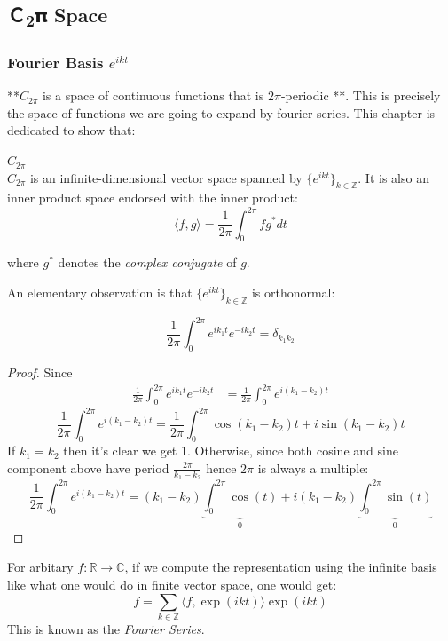 \subsection{Ｃ\textsubscript{2}𝛑 Space}

\subsubsection{Fourier Basis $e^{ikt}$}

**$C_{2\pi}$  is a space of  continuous functions that is $2\pi$-periodic **. This is precisely the space of functions we are going to expand by fourier series. This chapter is dedicated to show that:

\begin{theorem}\textbf{$C_{2\pi}$}\\
$C_{2\pi}$ is an infinite-dimensional vector space spanned by $\{e^{ikt}\}_{k\in\mathbb{Z}}$. It is also an inner product space endorsed with the inner product:
\begin{equation}
\langle f,g \rangle = \frac{1}{2\pi}\int_{0}^{2\pi} fg^*dt
\end{equation}

\end{theorem}where $g^*$ denotes the \textit{complex conjugate} of $g$.

An elementary observation is that  $\{e^{ikt}\}_{k\in\mathbb{Z}}$ is orthonormal:

\begin{equation}
\frac{1}{2\pi}\int_0^{2\pi}e^{ik_1t}e^{-ik_2t}=\delta_{k_1k_2}
\end{equation}

\begin{proof}Since
\begin{equation}
\begin{aligned}
\frac{1}{2\pi}\int_0^{2\pi}e^{ik_1t}e^{-ik_2t} &= \frac{1}{2\pi}\int_0^{2\pi}e^{i(k_1-k_2)t}
\end{aligned}
\end{equation}
\begin{equation}
\frac{1}{2\pi}\int_0^{2\pi}e^{i(k_1-k_2)t} = \frac{1}{2\pi}\int_0^{2\pi}\cos(k_1-k_2)t + i\sin(k_1-k_2)t
\end{equation}
If $k_1=k_2$ then it's clear we get 1. Otherwise, since both cosine and sine component above have period $\frac{2\pi}{k_1 -k_2}$ hence $2\pi$ is always a multiple:
\begin{equation}
\frac{1}{2\pi}\int_0^{2\pi}e^{i(k_1-k_2)t}=(k_1-k_2)\underbrace{\int_0^{2\pi}\cos(t)}_{0}+i(k_1-k_2)\underbrace{\int_0^{2\pi} \sin(t)}_{0}
\end{equation}

\end{proof}For arbitary $f:\mathbb{R}\to \mathbb{C}$, if we compute the representation using the infinite basis like what one would do in finite vector space, one would get:
\begin{equation}
\label{fe}
f=\sum_{k\in\mathbb{Z}}\langle f, \exp(ikt)\rangle \exp(ikt)
\end{equation}
This is known as the \textit{Fourier Series}.

